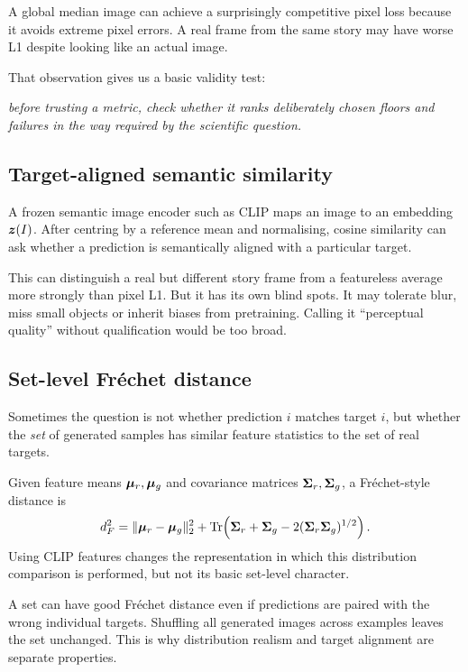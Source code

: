 A global median image can achieve a surprisingly competitive pixel loss because it avoids extreme pixel errors. A real frame from the same story may have worse L1 despite looking like an actual image.

That observation gives us a basic validity test:
\begin{center}
  \emph{before trusting a metric, check whether it ranks deliberately chosen floors and failures in the way required by the scientific question.}
\end{center}

\subsection{Target-aligned semantic similarity}

A frozen semantic image encoder such as CLIP maps an image to an embedding \(\bm{z}(I)\). After centring by a reference mean and normalising, cosine similarity can ask whether a prediction is semantically aligned with a particular target.

This can distinguish a real but different story frame from a featureless average more strongly than pixel L1. But it has its own blind spots. It may tolerate blur, miss small objects or inherit biases from pretraining. Calling it ``perceptual quality'' without qualification would be too broad.

\subsection{Set-level Fr\'echet distance}

Sometimes the question is not whether prediction \(i\) matches target \(i\), but whether the \emph{set} of generated samples has similar feature statistics to the set of real targets.

Given feature means \(\bm{\mu}_r,\bm{\mu}_g\) and covariance matrices \(\bm{\Sigma}_r,\bm{\Sigma}_g\), a Fr\'echet-style distance is
\begin{equation}
  d_F^2
  = \lVert \bm{\mu}_r-\bm{\mu}_g\rVert_2^2
  + \mathrm{Tr}\!\left(
      \bm{\Sigma}_r+\bm{\Sigma}_g
      -2(\bm{\Sigma}_r\bm{\Sigma}_g)^{1/2}
    \right).
  \label{eq:week10-frechet}
\end{equation}
Using CLIP features changes the representation in which this distribution comparison is performed, but not its basic set-level character.

A set can have good Fr\'echet distance even if predictions are paired with the wrong individual targets. Shuffling all generated images across examples leaves the set unchanged. This is why distribution realism and target alignment are separate properties.

